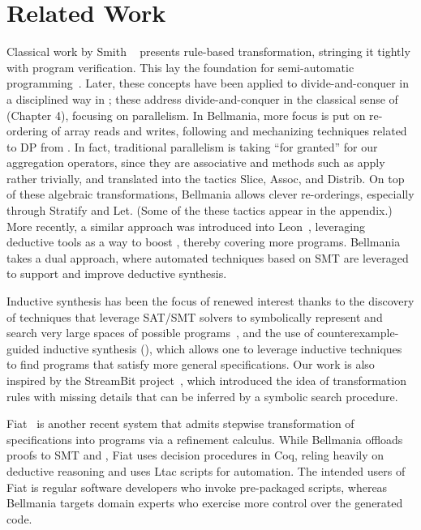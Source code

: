 \section{Related Work}
\label{related}

Classical work by Smith \etal~\cite{AI85/Smith} presents rule-based transformation, stringing it
tightly with program verification. This lay the foundation for semi-automatic programming~\cite{CPS91/Blaine,TSE90/Smith,TPHOLs96/Butler}.
\cbstart{}
Later, these concepts have been applied to divide-and-conquer in a disciplined way
in \cite{PASCO97/Teo,EuroPar96/Chin}; these address divide-and-conquer in the
classical sense of \cite{09/CLRS} (Chapter 4), focusing on parallelism.
In Bellmania, more focus is put on re-ordering of array reads and writes, following
and mechanizing techniques related to DP from \cite{SODA06/Chowdhury,SPAA08/Chowdhury}.
In fact, traditional parallelism is taking ``for granted'' for our aggregation
operators, since they are associative and methods such as \cite{PLDI94/Fisher} apply rather trivially, and translated into the tactics \textsf{Slice}, \textsf{Assoc}, and \textsf{Distrib}.
On top of these algebraic transformations, Bellmania allows clever re-orderings,
especially through \textsf{Stratify} and \textsf{Let}.
(Some of the these tactics appear in the appendix.)
\cbend
More recently, a similar approach was introduced into Leon~\cite{OOPSLA13/Kneuss}, leveraging deductive
tools as a way to boost {\cegis}, thereby covering more programs. Bellmania takes a dual approach, where
automated techniques based on SMT are leveraged to support and improve deductive synthesis.

Inductive synthesis has been the focus of renewed interest thanks to the discovery of techniques that leverage SAT/SMT solvers to symbolically represent and search very large spaces of possible programs~\cite{APLAS09/Solar-Lezama, PLDI11/Gulwani, Onward13/Torlak},
and the use of counterexample-guided inductive synthesis ({\cegis}), which allows one to leverage inductive techniques to find programs that satisfy more general specifications. 
Our work is also inspired by the StreamBit project~\cite{PLDI05/Solar-Lezama}, which
introduced the idea of transformation rules with missing details that can be inferred by a symbolic search procedure.

Fiat~\cite{POPL15/Delaware} is another recent system that admits stepwise transformation of specifications
into programs via a refinement calculus. While Bellmania offloads proofs to SMT and \Sketch{},
Fiat uses decision procedures in Coq,
reling heavily on deductive reasoning and uses Ltac scripts for automation.
The intended users of Fiat is regular software developers who invoke pre-packaged scripts,
whereas Bellmania targets domain experts who exercise more control over the generated code.


